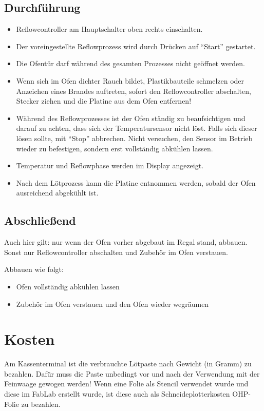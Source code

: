 \documentclass{\basedir/fablab-document}
\begin{document}
\subsection{Durchführung}
\begin{itemize}
	\item Reflowcontroller am Hauptschalter oben rechts einschalten.
	\item Der voreingestellte Reflowprozess wird durch Drücken auf \enquote{Start} gestartet.
	\item Die Ofentür darf während des gesamten Prozesses nicht geöffnet werden.
	\item Wenn sich im Ofen dichter Rauch bildet, Plastikbauteile schmelzen oder Anzeichen eines Brandes auftreten, sofort den Reflowcontroller abschalten, Stecker ziehen und die Platine aus dem Ofen entfernen!
	\item Während des Reflowprozesses ist der Ofen ständig zu beaufsichtigen und darauf zu achten, dass sich der Temperatursensor nicht löst. Falls sich dieser lösen sollte, mit \enquote{Stop} abbrechen. Nicht versuchen, den Sensor im Betrieb wieder zu befestigen, sondern erst vollständig abkühlen lassen.
	\item Temperatur und Reflowphase werden im Display angezeigt.
	\item Nach dem Lötprozess kann die Platine entnommen werden, sobald der Ofen ausreichend abgekühlt ist.
\end{itemize}
\subsection{Abschließend}
Auch hier gilt: nur wenn der Ofen vorher abgebaut im Regal stand, abbauen. Sonst nur Reflowcontroller abschalten und Zubehör im Ofen verstauen.

Abbauen wie folgt:
\begin{itemize}
	\item Ofen vollständig abkühlen lassen
	\item Zubehör im Ofen verstauen und den Ofen wieder wegräumen
\end{itemize}



\section{Kosten}
Am Kassenterminal ist die verbrauchte Lötpaste nach Gewicht (in Gramm) zu bezahlen. Dafür muss die Paste unbedingt vor und nach der Verwendung mit der Feinwaage gewogen werden! Wenn eine Folie als Stencil verwendet wurde und diese im FabLab erstellt wurde, ist diese auch als Schneideplotterkosten OHP-Folie zu bezahlen.


\end{document}
